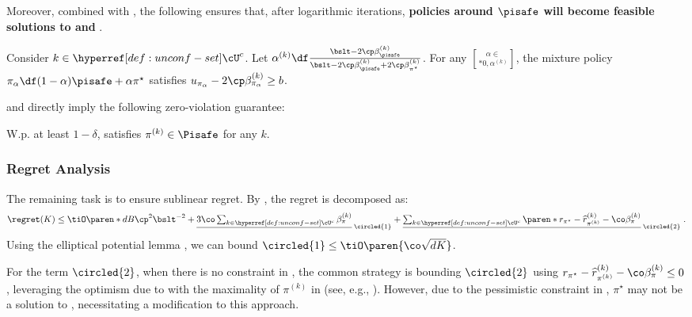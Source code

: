 Moreover, combined with , the following  ensures that, after logarithmic iterations, \textbf{policies around $\boldsymbol{\pisafe}$ will become feasible solutions to \optpes and }.
\begin{lemma}\label{lemma:alpha-feasibility-main}
Consider $k \in \unconfBandit^c$.
Let $\alpha^{(k)} \df \frac{\bslt - 2\cp \beta^{(k)}_{\pisafe}}{\bslt - 2\cp \beta^{(k)}_{\pisafe} + 2\cp \beta^{(k)}_{\pi^\star}}$.
For any $\alpha \in \brack*{0, \alpha^{(k)}}$, the mixture policy \(\pi_\alpha \df (1-\alpha) \pisafe + \alpha \pi^\star\) satisfies
$u_{\pi_\alpha} - 2\cp \beta^{(k)}_{\pi_\alpha} \geq b$.
\end{lemma}
 and  directly imply the following zero-violation guarantee:
\begin{corollary}
W.p. at least $1-\delta$,  satisfies $\pi^{(k)} \in \Pisafe$ for any $k$.
\end{corollary}

\subsubsection{Regret Analysis}
The remaining task is to ensure sublinear regret. By , the regret is decomposed as:
\begin{align*}
{\textstyle
\regret(K) 
\leq \tiO\paren*{d B \cp^2\bslt^{-2}}
+ \underline{3\co \sum_{k \in \unconfBandit^c}\beta^{(k)}_\pi}_{\;\circled{1}}
+ \underline{\sum_{k \in \unconfBandit^c} \paren*{r_{\pi^\star} - \widehat{r}^{(k)}_{\pi^{(k)}} - \co \beta^{(k)}_\pi}}_{\;\circled{2}}\;.
}
\end{align*}
Using the elliptical potential lemma \citep{abbasi2011improved}, we can bound $\circled{1} \leq \tiO\paren{\co \sqrt{dK}}$.

For the term $\circled{2}$, when there is no constraint in \optpes, the common strategy is bounding $\circled{2}$ using $r_{\pi^\star} - \widehat{r}^{(k)}_{\pi^{(k)}} - \co \beta^{(k)}_\pi \leq 0$, leveraging the optimism due to  with the maximality of $\pi^{(k)}$ in \optpes (see, e.g., \citet{abbasi2011improved}).
However, due to the pessimistic constraint in \optpes, $\pi^\star$ may not be a solution to \optpes, necessitating a modification to this approach.


